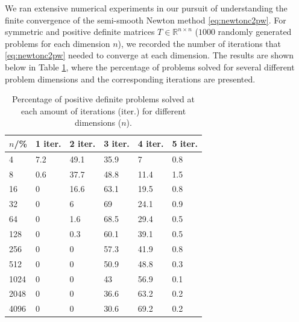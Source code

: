 \documentclass[11pt]{article}
\newcommand{\R}{\mathbb R}
\begin{document}
We ran extensive numerical experiments in our pursuit of understanding the finite convergence of the semi-smooth Newton method \eqref{eq:newtonc2pw}. For symmetric and positive definite matrices $T\in\R^{n\times n}$ ($1000$ randomly generated problems for each dimension $n$), we recorded the number of iterations that \eqref{eq:newtonc2pw} needed to converge at each dimension. The results are shown below in Table \ref{tab:NumericalExperimentsGen}, where the percentage of problems solved for several different problem dimensions and the corresponding iterations are presented. 
\begin{table}[h!]
\centering
\begin{tabular}{|l|l|l|l|l|l|}
\hline
$n$/\%& 1 iter. & 2 iter. & 3 iter. & 4 iter. & 5 iter.\\ \hline
4 & 7.2 & 49.1 & 35.9 & 7 & 0.8\\ \hline
8 & 0.6 & 37.7 & 48.8 & 11.4 & 1.5\\ \hline
16 & 0 & 16.6 & 63.1 & 19.5 & 0.8\\ \hline
32 & 0 & 6 & 69 & 24.1 & 0.9\\ \hline
64 & 0 & 1.6 & 68.5 & 29.4 & 0.5\\ \hline
128 & 0 & 0.3 & 60.1 & 39.1 & 0.5\\ \hline
256 & 0 & 0 & 57.3 & 41.9 & 0.8\\ \hline
512 & 0 & 0 & 50.9 & 48.8 & 0.3\\ \hline
1024 & 0 & 0 & 43 & 56.9 & 0.1\\ \hline
2048 & 0 & 0 & 36.6 & 63.2 & 0.2\\ \hline
4096 & 0 & 0 & 30.6 & 69.2 & 0.2\\ \hline
\end{tabular}
\caption{Percentage of positive definite problems solved at each amount of iterations (iter.) for different dimensions ($n$).}
\label{tab:NumericalExperimentsGen}
\end{table}
\end{document}
